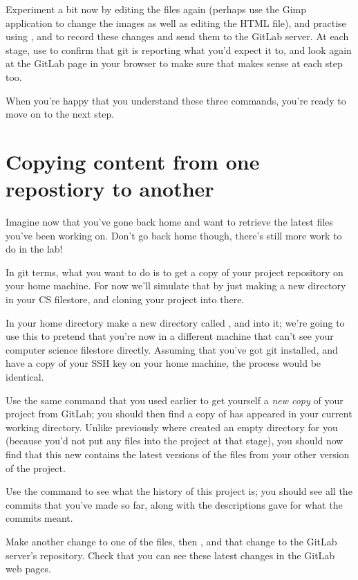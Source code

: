 Experiment a bit now by editing the files again (perhaps use the Gimp application to change the images as well as editing the HTML file), and practise using ,  and  to record these changes and send them to the GitLab server. At each stage, use  to confirm that git is reporting what you'd expect it to, and look again at the GitLab page in your browser to make sure that makes sense at each step too. 

When you're happy that you understand these three commands, you're ready to move on to the next step.

\section{Copying content from one repostiory to another}
Imagine now that you've gone back home and want to retrieve the latest files you've been working on. Don't go back home though, there's still more work to do in the lab! 

In git terms, what you want to do is to get a copy of your project repository on your home machine. For now we'll simulate that by just making a new directory in your CS filestore, and cloning your project into there. 

In your home directory make a new directory called , and  into it; we're going to use this to pretend that you're now in a different machine that can't see your computer science filestore directly. Assuming that you've got git installed, and have a copy of your SSH key on your home machine, the process would be identical.

Use the same  command that you used earlier to get yourself a \emph{new copy} of your  project from GitLab; you should then find a copy of  has appeared in your current working directory. Unlike previously where  created an empty directory for you (because you'd not put any files into the project at that stage), you should now find that this new  contains the latest versions of the files from your other version of the project.

Use the  command to see what the history of this project is; you should see all the commits that you've made so far, along with the descriptions gave for what the commits meant. 

Make another change to one of the files, then ,  and  that change to the GitLab server's repository. Check that you can see these latest changes in the GitLab web pages.

